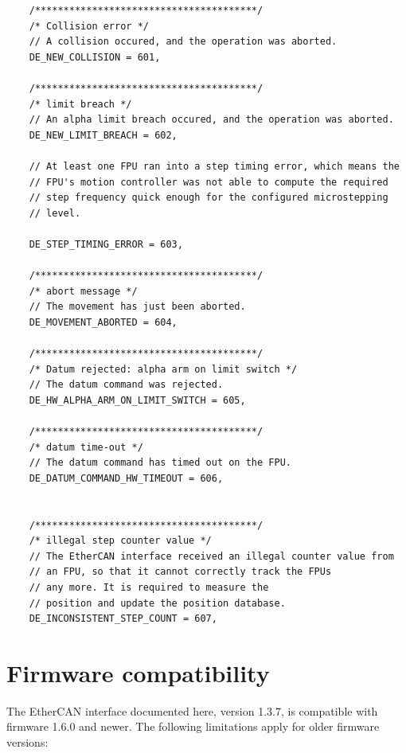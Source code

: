 \documentclass[11pt,a4paper]{scrartcl}
\begin{document}
\begin{verbatim}
    /***************************************/
    /* Collision error */
    // A collision occured, and the operation was aborted.
    DE_NEW_COLLISION = 601,

    /***************************************/
    /* limit breach */
    // An alpha limit breach occured, and the operation was aborted.
    DE_NEW_LIMIT_BREACH = 602,

    // At least one FPU ran into a step timing error, which means the
    // FPU's motion controller was not able to compute the required
    // step frequency quick enough for the configured microstepping
    // level.

    DE_STEP_TIMING_ERROR = 603,

    /***************************************/
    /* abort message */
    // The movement has just been aborted.
    DE_MOVEMENT_ABORTED = 604,

    /***************************************/
    /* Datum rejected: alpha arm on limit switch */
    // The datum command was rejected.
    DE_HW_ALPHA_ARM_ON_LIMIT_SWITCH = 605,

    /***************************************/
    /* datum time-out */
    // The datum command has timed out on the FPU.
    DE_DATUM_COMMAND_HW_TIMEOUT = 606,


    /***************************************/
    /* illegal step counter value */
    // The EtherCAN interface received an illegal counter value from
    // an FPU, so that it cannot correctly track the FPUs
    // any more. It is required to measure the
    // position and update the position database.
    DE_INCONSISTENT_STEP_COUNT = 607,

\end{verbatim}

\section{Firmware compatibility}
\label{sec:firmware_compatibility}

The EtherCAN interface documented here, version 1.3.7, is compatible with firmware
1.6.0 and newer. The following limitations apply for older firmware versions:
\end{document}
